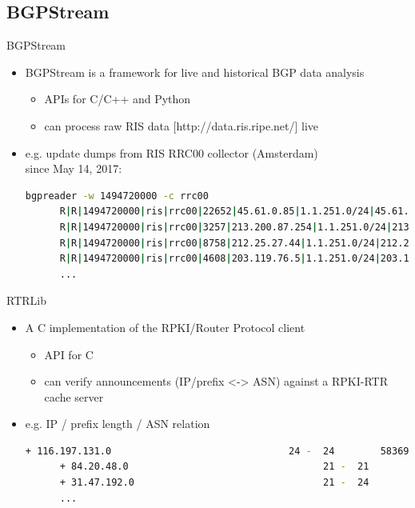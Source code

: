 \documentclass[ucs,9pt]{beamer}
\begin{document}
\subsection{BGPStream}

\begin{frame}[fragile]{BGPStream}

  \begin{itemize}
  \item
    BGPStream is a framework for live and historical BGP data analysis
    \begin{itemize}
    \item
      APIs for C/C++ and Python
    \item
      can process raw RIS data [http://data.ris.ripe.net/] live
    \end{itemize}
  \item
    e.g. update dumps from RIS RRC00 collector (Amsterdam)\\since May 14, 2017:\\
    \begin{lstlisting}[language=sh]%[mathescape=false]
      bgpreader -w 1494720000 -c rrc00
      R|R|1494720000|ris|rrc00|22652|45.61.0.85|1.1.251.0/24|45.61.0.85|22652 6453 3491 38040 23969|23969|||
      R|R|1494720000|ris|rrc00|3257|213.200.87.254|1.1.251.0/24|213.200.87.254|3257 3491 38040 23969|23969|3257:8059 3257:30275 3257:50001 3257:54900 3257:54901||
      R|R|1494720000|ris|rrc00|8758|212.25.27.44|1.1.251.0/24|212.25.27.44|8758 8220 38040 23969|23969|8220:65010 8220:65401 8758:110 8758:300||
      R|R|1494720000|ris|rrc00|4608|203.119.76.5|1.1.251.0/24|203.119.76.5|4608 1221 4637 3491 38040 23969|23969|||
      ...
    \end{lstlisting}
  \end{itemize}
\end{frame}

\begin{frame}[fragile]{RTRLib}

  \begin{itemize}
  \item
    A C implementation of the RPKI/Router Protocol client
    \begin{itemize}
    \item
      API for C
    \item
      can verify announcements (IP/prefix <-> ASN) against a RPKI-RTR cache server
    \end{itemize}
  \item
    e.g. IP / prefix length / ASN relation
    \begin{lstlisting}[language=sh]%[mathescape=false]
      + 116.197.131.0                               24 -  24        58369
      + 84.20.48.0                                  21 -  21         6830
      + 31.47.192.0                                 21 -  24        49800
      ...
    \end{lstlisting}
  \end{itemize}
\end{frame}
\end{document}
